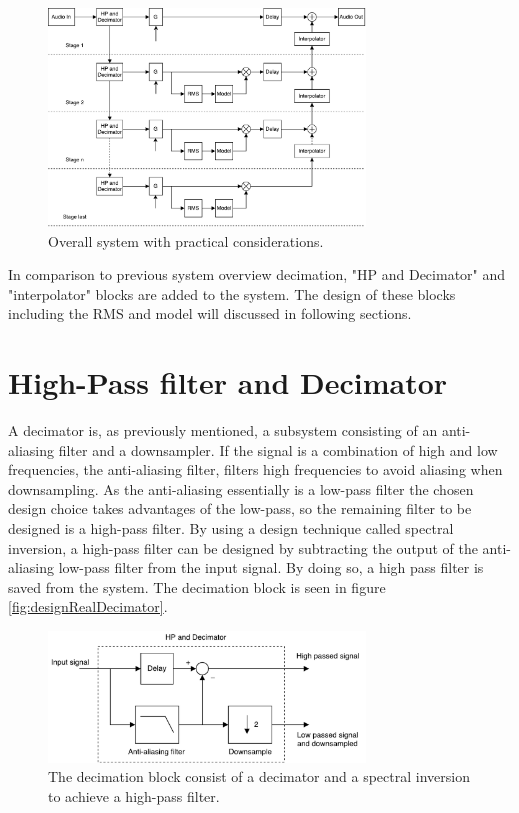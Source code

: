 \begin{figure}[H]
\centering
\includegraphics[width=0.75\textwidth]{figures/designRealBlock1.pdf}
\caption{Overall system with practical considerations.}
\label{fig:designRealBlock}
\end{figure}




In comparison to previous system overview decimation, "HP and Decimator" and "interpolator" blocks are added to the system. The design of these blocks including the RMS and model will discussed in following sections.


\section{High-Pass filter and Decimator}

A decimator is, as previously mentioned, a subsystem consisting of an anti-aliasing filter and a downsampler. If the signal is a combination of high and low frequencies, the anti-aliasing filter, filters high frequencies to avoid aliasing when downsampling. As the anti-aliasing essentially is a low-pass filter the chosen design choice takes advantages of the low-pass, so the remaining filter to be designed is a high-pass filter. By using a design technique called spectral inversion, a high-pass filter can be designed by subtracting the output of the anti-aliasing low-pass filter from the input signal. By doing so, a high pass filter is saved from the system. The decimation block is seen in figure \autoref{fig:designRealDecimator}.

\begin{figure}[H]
\centering
\includegraphics[width=0.75\textwidth]{figures/designRealDecimator.pdf}
\caption{The decimation block consist of a decimator and a spectral inversion to achieve a high-pass filter.}
\label{fig:designRealDecimator}
\end{figure}

